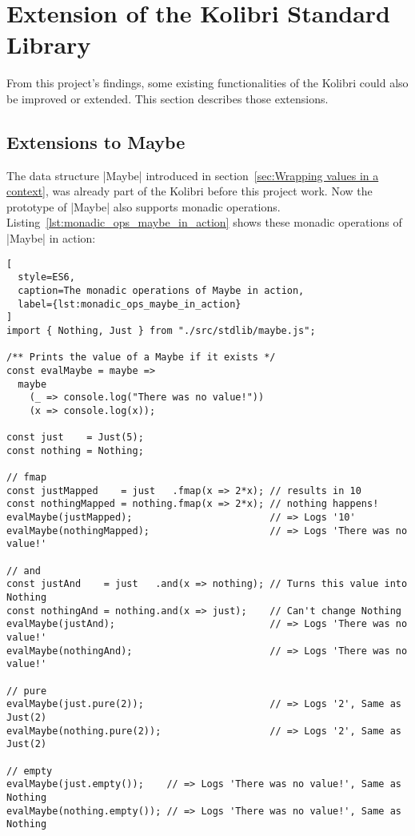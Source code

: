 \section{Extension of the Kolibri Standard Library}
\label{sec:Extension of the Kolibri Standard Library}
From this project's findings, some existing functionalities of the Kolibri
could also be improved or extended. This section describes those extensions.

\subsection{Extensions to Maybe} %
\label{sub:Extensions to Maybe}
The data structure |Maybe| introduced in section~\ref{sec:Wrapping values in a
context}, was already part of the Kolibri before this project work. Now the
prototype of |Maybe| also supports monadic operations.\\
Listing~\ref{lst:monadic_ops_maybe_in_action} shows these monadic operations of
|Maybe| in action:

\begin{lstlisting}[
  style=ES6,
  caption=The monadic operations of Maybe in action,
  label={lst:monadic_ops_maybe_in_action}
]
import { Nothing, Just } from "./src/stdlib/maybe.js";

/** Prints the value of a Maybe if it exists */
const evalMaybe = maybe =>
  maybe
    (_ => console.log("There was no value!"))
    (x => console.log(x));

const just    = Just(5);
const nothing = Nothing;

// fmap 
const justMapped    = just   .fmap(x => 2*x); // results in 10
const nothingMapped = nothing.fmap(x => 2*x); // nothing happens!
evalMaybe(justMapped);                        // => Logs '10'
evalMaybe(nothingMapped);                     // => Logs 'There was no value!' 

// and
const justAnd    = just   .and(x => nothing); // Turns this value into Nothing
const nothingAnd = nothing.and(x => just);    // Can't change Nothing
evalMaybe(justAnd);                           // => Logs 'There was no value!'
evalMaybe(nothingAnd);                        // => Logs 'There was no value!' 

// pure
evalMaybe(just.pure(2));                      // => Logs '2', Same as Just(2)
evalMaybe(nothing.pure(2));                   // => Logs '2', Same as Just(2)

// empty
evalMaybe(just.empty());    // => Logs 'There was no value!', Same as Nothing
evalMaybe(nothing.empty()); // => Logs 'There was no value!', Same as Nothing
\end{lstlisting}

